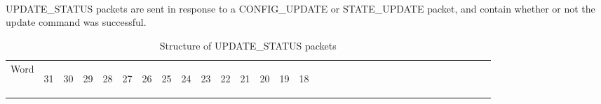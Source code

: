 \documentclass[11pt]{article}
\begin{document}
\paragraph{}
UPDATE\_STATUS packets are sent in response to a CONFIG\_UPDATE or STATE\_UPDATE packet, 
and contain whether or not the update command was successful.
\begin{table}[h!]
    \centering
    \caption{Structure of UPDATE\_STATUS packets}
    \label{tab:updateStatusDef}
    \begin{tabular}{|p{1cm}|p{0.04cm}|p{0.04cm}|m{0.04cm}|m{0.04cm}|m{0.04cm}|m{0.04cm}|m{0.04cm}|m{0.04cm}|m{0.04cm}|
        m{0.04cm}|m{0.04cm}|m{0.04cm}|m{0.04cm}|m{0.04cm}|m{0.04cm}|m{0.04cm}|m{0.04cm}|m{0.04cm}|m{0.04cm}|m{0.04cm}|
        m{0.04cm}|m{0.04cm}|m{0.04cm}|m{0.04cm}|m{0.04cm}|m{0.04cm}|m{0.04cm}|m{0.04cm}|m{0.04cm}|m{0.04cm}|m{0.04cm}|m{0.04cm}|}
        \hline
        Word & 
        \begin{sideways}31\end{sideways} &
        \begin{sideways}30\end{sideways} & 
        \begin{sideways}29\end{sideways} &
        \begin{sideways}28\end{sideways} &
        \begin{sideways}27\end{sideways} &
        \begin{sideways}26\end{sideways} &
        \begin{sideways}25\end{sideways} &
        \begin{sideways}24\end{sideways} &
        \begin{sideways}23\end{sideways} &
        \begin{sideways}22\end{sideways} &
        \begin{sideways}21\end{sideways} &
        \begin{sideways}20\end{sideways} &
        \begin{sideways}19\end{sideways} &
        \begin{sideways}18\end{sideways} &

\end{tabular}
\end{table}
\end{document}
